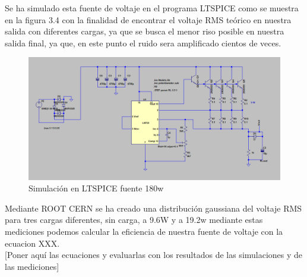 Se ha simulado esta fuente de voltaje en el programa LTSPICE como se muestra en la figura 3.4 con la finalidad de encontrar el voltaje RMS teórico en nuestra salida con diferentes cargas, ya que se busca el menor riso posible en nuestra salida final, ya que, en este punto el ruido sera amplificado cientos de veces. \\
\begin{figure}[H]
\centering
\includegraphics[width=12cm]{Capitulo3/figs/SIMFUENTE.png}
\caption{Simulación en LTSPICE fuente 180w}
\end{figure}
Mediante ROOT CERN se ha creado una distribución gaussiana del voltaje RMS para tres cargas diferentes, sin carga, a 9.6W y a 19.2w mediante estas mediciones podemos calcular la eficiencia de nuestra fuente de voltaje con la ecuacion XXX.\\

[Poner aquí las ecuaciones y evaluarlas con los resultados de las simulaciones y de las mediciones]

